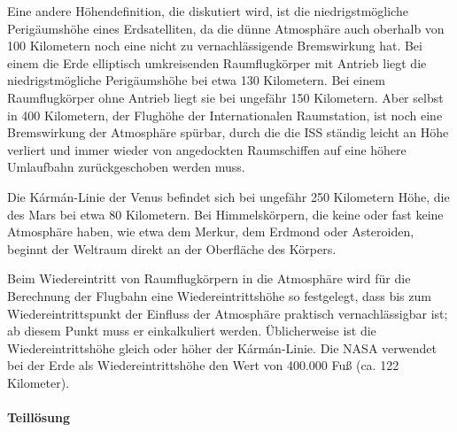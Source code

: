{Eine andere Höhendefinition, die diskutiert wird, ist die niedrigstmögliche Perigäumshöhe eines Erdsatelliten, da die dünne Atmosphäre auch oberhalb von 100 Kilometern noch eine nicht zu vernachlässigende Bremswirkung hat.
Bei einem die Erde elliptisch umkreisenden Raumflugkörper mit Antrieb liegt die niedrigstmögliche Perigäumshöhe bei etwa 130 Kilometern.
Bei einem Raumflugkörper ohne Antrieb liegt sie bei ungefähr 150 Kilometern.
Aber selbst in 400 Kilometern, der Flughöhe der Internationalen Raumstation, ist noch eine Bremswirkung der Atmosphäre spürbar, durch die die ISS ständig leicht an Höhe verliert und immer wieder von angedockten Raumschiffen auf eine höhere Umlaufbahn zurückgeschoben werden muss.

Die Kármán-Linie der Venus befindet sich bei ungefähr 250 Kilometern Höhe, die des Mars bei etwa 80 Kilometern.
Bei Himmelskörpern, die keine oder fast keine Atmosphäre haben, wie etwa dem Merkur, dem Erdmond oder Asteroiden, beginnt der Weltraum direkt an der Oberfläche des Körpers.

Beim Wiedereintritt von Raumflugkörpern in die Atmosphäre wird für die Berechnung der Flugbahn eine Wiedereintrittshöhe so festgelegt, dass bis zum Wiedereintrittspunkt der Einfluss der Atmosphäre praktisch vernachlässigbar ist; ab diesem Punkt muss er einkalkuliert werden.
Üblicherweise ist die Wiedereintrittshöhe gleich oder höher der Kármán-Linie.
Die NASA verwendet bei der Erde als Wiedereintrittshöhe den Wert von 400.000 Fuß (ca. 122 Kilometer).

}



\paragraph*{Teillösung}


